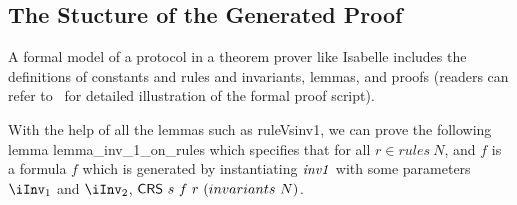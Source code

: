
\subsection{The Stucture of the Generated Proof}
A formal model of a protocol in a theorem prover like Isabelle
includes the definitions of constants and rules and invariants, lemmas, and proofs
(readers can refer to~\cite{paraverifier} for detailed illustration of the formal proof script).

With the help of all the lemmas such as {\sf ruleVsinv1},
we can prove the following lemma  {\sf lemma\_inv\_1\_on\_rules}
which specifies that for all $r \in rules ~N$, and $f$ is a formula $f$
which is generated by instantiating ${\it inv1}$ with some parameters
$\iInv_1$ and $\iInv_2$, ${\sf CRS}~s~ f~ r~ (invariants~ N)$.


